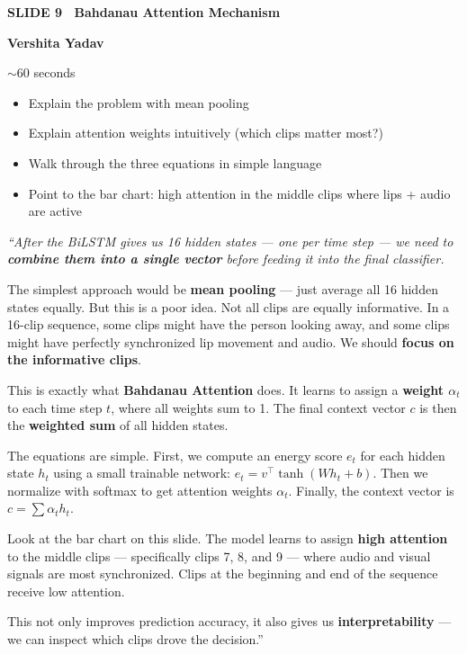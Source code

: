 \documentclass[11pt, a4paper]{article}
\newcommand{\slideheading}[3]{%
  \vspace{0.6cm}
  \begin{tcolorbox}[slidebox]
    \textbf{\color{NavyBlue}SLIDE #1 \textemdash\ #2}\\[2pt]
    \begin{tcolorbox}[presenterbox, title=Presenter(s)]
      \color{AccBlue}\bfseries #3
    \end{tcolorbox}
  \end{tcolorbox}
}
\newcommand{\timing}[1]{%
  \begin{tcolorbox}[timebox, title=Suggested Time]
    \color{AccOrange} #1
  \end{tcolorbox}
}
\newcommand{\keypoints}[1]{%
  \begin{tcolorbox}[keybox, title=Key Points to Cover]
    #1
  \end{tcolorbox}
}
\newcommand{\script}[1]{%
  \begin{mdframed}[
    backgroundcolor=white,
    linecolor=MidText!40,
    linewidth=0.5pt,
    leftmargin=0pt,
    rightmargin=0pt,
    innerleftmargin=10pt,
    innerrightmargin=8pt,
    innertopmargin=8pt,
    innerbottommargin=8pt,
    roundcorner=3pt
  ]
  \itshape\color{MidText}
  #1
  \end{mdframed}
}
\begin{document}
\slideheading{9}{Bahdanau Attention Mechanism}{Vershita Yadav}

\timing{$\sim$60 seconds}

\keypoints{%
\begin{itemize}[leftmargin=*, itemsep=2pt]
  \item Explain the problem with mean pooling
  \item Explain attention weights intuitively (which clips matter most?)
  \item Walk through the three equations in simple language
  \item Point to the bar chart: high attention in the middle clips where lips + audio are active
\end{itemize}
}

\script{%
``After the BiLSTM gives us 16 hidden states --- one per time step --- we need to \textbf{combine them into a single vector} before feeding it into the final classifier.

The simplest approach would be \textbf{mean pooling} --- just average all 16 hidden states equally. But this is a poor idea. Not all clips are equally informative. In a 16-clip sequence, some clips might have the person looking away, and some clips might have perfectly synchronized lip movement and audio. We should \textbf{focus on the informative clips}.

This is exactly what \textbf{Bahdanau Attention} does. It learns to assign a \textbf{weight $\alpha_t$} to each time step $t$, where all weights sum to 1. The final context vector $c$ is then the \textbf{weighted sum} of all hidden states.

The equations are simple. First, we compute an energy score $e_t$ for each hidden state $h_t$ using a small trainable network: $e_t = v^\top \tanh(W h_t + b)$. Then we normalize with softmax to get attention weights $\alpha_t$. Finally, the context vector is $c = \sum \alpha_t h_t$.

Look at the bar chart on this slide. The model learns to assign \textbf{high attention} to the middle clips --- specifically clips 7, 8, and 9 --- where audio and visual signals are most synchronized. Clips at the beginning and end of the sequence receive low attention.

This not only improves prediction accuracy, it also gives us \textbf{interpretability} --- we can inspect which clips drove the decision.''
}
\end{document}
